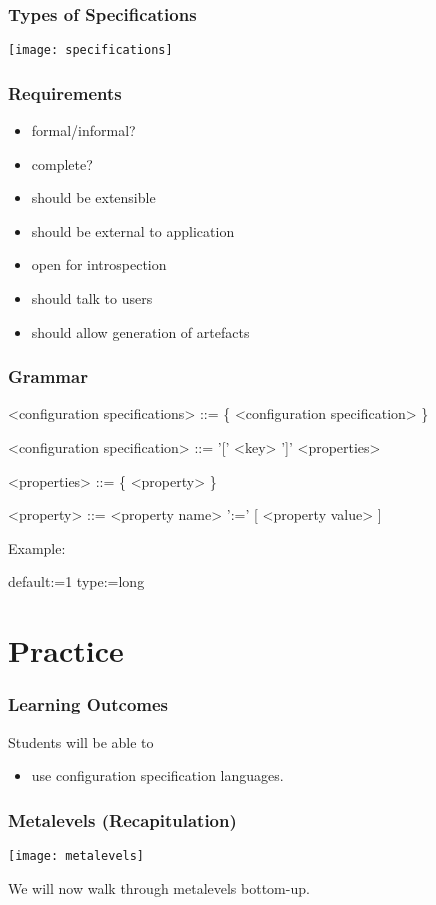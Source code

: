 \begin{frame}
	\frametitle{Types of Specifications}
	\texttt{[image: specifications]}
\end{frame}


\begin{frame}
	\frametitle{Requirements}

	\begin{itemize}
	\item formal/informal?
	\item complete?
	\pause
	\item should be extensible
	\item should be external to application
	\item open for introspection
	\item should talk to users
	\item should allow generation of artefacts
	\end{itemize}
\end{frame}


\begin{frame}[fragile]
	\frametitle{Grammar}
	\begin{grammar}
	<configuration specifications> ::= \{ <configuration specification> \}

	<configuration specification> ::= '[' <key> ']' <properties>

	<properties> ::= \{ <property> \}

	<property> ::= <property name> ':=' [ <property value> ]
	\end{grammar}

	\vspace{1cm}
	Example:
	\begin{code}
	default:=1
	type:=long
	\end{code}
\end{frame}


\section{Practice}

\begin{frame}
	\frametitle{Learning Outcomes}
	Students will be able to
	\begin{itemize}
	\item use configuration specification languages.
	\end{itemize}
\end{frame}

\begin{frame}
	\frametitle{Metalevels (Recapitulation)}
	\texttt{[image: metalevels]}

	We will now walk through metalevels bottom-up.
\end{frame}

